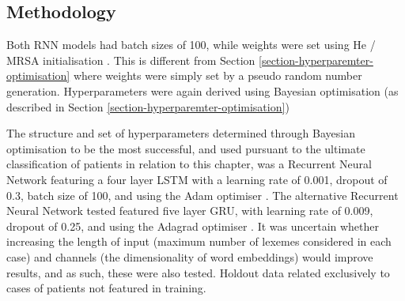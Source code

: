 %
%
%







\subsection{Methodology}



Both RNN models had batch sizes of 100, while weights were set using He / MRSA initialisation \cite{he2004initialization}. This is different from Section \ref{section-hyperparemter-optimisation} where weights were simply set by a pseudo random number generation. Hyperparameters were again derived using Bayesian optimisation (as described in Section \ref{section-hyperparemter-optimisation}) 


The structure and set of hyperparameters determined through Bayesian optimisation to be the most successful, and used pursuant to the ultimate classification of patients in relation to this chapter, was a Recurrent Neural Network featuring a four layer LSTM with a learning rate of 0.001, dropout of 0.3, batch size of 100, and using the Adam optimiser \cite{kingma2014adam}. The alternative Recurrent Neural Network tested featured five layer GRU, with learning rate of 0.009, dropout of 0.25, and using the Adagrad optimiser \cite{duchi2011adaptive}. It was uncertain whether increasing the length of input (maximum number of lexemes considered in each case) and channels (the dimensionality of word embeddings) would improve results, and as such, these were also tested. Holdout data related exclusively to cases of patients not featured in training.


